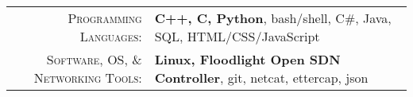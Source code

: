 %
%
%

\renewcommand{\arraystretch}{1.1}

	\begin{tabular}{>{}r>{}p{13cm}} 
		\textsc{Programming Languages:}               	&   \textbf{C++, C, Python}, bash/shell, C\#, Java, SQL, HTML/CSS/JavaScript \\ 
		\textsc{Software, OS, \& Networking Tools:}	        &   \textbf{Linux,  Floodlight Open SDN Controller}, git, netcat, ettercap, json\\ 
	\end{tabular}